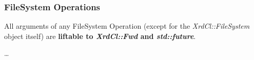 \documentclass{article}
\begin{document}
	    \subsubsection{FileSystem Operations}
	    
	    	All arguments of any FileSystem Operation (except for the \textit{XrdCl::FileSystem} object itself) are \textbf{liftable to \textit{XrdCl::Fwd} and \textit{std::future}}.
	    	
	    
	    \ldots		
\end{document}
